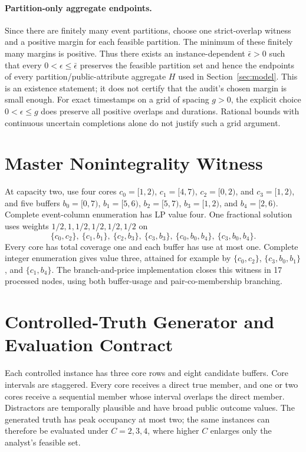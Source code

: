 \paragraph{Partition-only aggregate endpoints.}
Since there are finitely many event partitions, choose one strict-overlap
witness and a positive margin for each feasible partition. The minimum of
these finitely many margins is positive. Thus there exists an
instance-dependent $\bar\epsilon>0$ such that every
$0<\epsilon\le\bar\epsilon$ preserves the feasible partition set and hence
the endpoints of every partition/public-attribute aggregate $H$ used in
Section~\ref{sec:model}. This is an existence statement; it does not certify
that the audit's chosen margin is small enough. For exact timestamps on a
grid of spacing $g>0$, the explicit choice $0<\epsilon\le g$ does preserve
all positive overlaps and durations. Rational bounds with continuous
uncertain completions alone do not justify such a grid argument.


\section{Master Nonintegrality Witness}
At capacity two, use four cores
$c_0=[1,2)$, $c_1=[4,7)$, $c_2=[0,2)$, and $c_3=[1,2)$, and five buffers
$b_0=[0,7)$, $b_1=[5,6)$, $b_2=[5,7)$, $b_3=[1,2)$, and $b_4=[2,6)$.
Complete event-column enumeration has LP value four. One fractional solution
uses weights $1/2,1,1/2,1/2,1/2,1/2$ on
\[
\{c_0,c_2\},\ \{c_1,b_1\},\ \{c_2,b_3\},\ \{c_3,b_3\},\
\{c_0,b_0,b_4\},\ \{c_3,b_0,b_4\}.
\]
Every core has total coverage one and each buffer has use at most one. Complete
integer enumeration gives value three, attained for example by
$\{c_0,c_2\}$, $\{c_3,b_0,b_1\}$, and $\{c_1,b_4\}$.
The branch-and-price implementation closes this witness in 17 processed nodes,
using both buffer-usage and pair-co-membership branching.

\section{Controlled-Truth Generator and Evaluation Contract}
Each controlled instance has three core rows and eight candidate buffers. Core
intervals are staggered. Every core receives a direct true member, and one or
two cores receive a sequential member whose interval overlaps the direct
member. Distractors are temporally plausible and have broad public outcome
values. The generated truth has peak occupancy at most two; the same instances
can therefore be evaluated under $C=2,3,4$, where higher $C$ enlarges only the
analyst's feasible set.

